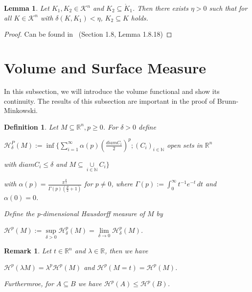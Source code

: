 \documentclass[a4paper]{book}
\newtheorem{lemma}[theorem]{Lemma}%
\newtheorem{remark}[theorem]{Remark}%
\newtheorem{definition}[theorem]{Definition}%
\numberwithin{theorem}{section}%
\begin{document}
\begin{lemma}
    Let $K_{1},K_{2}\in\mathscr{K}^{n}$ and $K_{2}\subseteq\mathring{K}_{1}$. Then there exists $\eta>0$ such that for all $K\in\mathscr{K}^{n}$ with $\delta(K,K_{1})<\eta$, $K_{2}\subseteq K$ holds.
\end{lemma}
\begin{proof}
    Can be found in~\citep{schneider2014convex} (Section 1.8, Lemma 1.8.18)
\end{proof}
    
\section{Volume and Surface Measure}
In this subsection, we will introduce the volume functional and show its continuity. The results of this subsection are important in the proof of Brunn-Minkowski.

\begin{definition}
	Let $M\subseteq\mathbb{R}^{n}, p\geq0$. For $\delta>0$ define
	\begin{center}
		$\displaystyle \mathscr{H}_{\delta}^{P}(M):=\inf\{\sum\limits_{i=1}^{\infty}\alpha(p)(\frac{diam C_{i}}{2})^{p};(C_{i})_{i\in\mathbb{N}}$ open sets in $\mathbb{R}^n$

		\hspace{1cm}with $diam C_{i}\leq\delta$ and $M\subseteq\underset{i\in\mathbb{N}}{\cup}{C_{i}}\}$
	\end{center}
	with $\alpha(p)=\frac{\pi^{\frac{p}{2}}}{\Gamma(p)(\frac{p}{2}+1)}$ for $p\neq0$, where $\Gamma(p):=\int_{0}^{\infty}t^{-1}e^{-t}\,dt$ and $\alpha(0)=0$.
	
	Define the p-dimensional Hausdorff measure of $M$ by
	\begin{center}
		$\mathscr{H}^{p}(M):=\underset{\delta>0}{\sup}\mathscr{H}_{\delta}^{p}(M)=\underset{\delta\to0}{\lim}\mathscr{H}_{\delta}^{p}(M)$.
	\end{center}
\end{definition}

\begin{remark}
	Let $t\in\mathbb{R}^{n}$ and $\lambda\in\mathbb{R}$, then we have
	\begin{center}
		$\mathscr{H}^{p}(\lambda M)=\lambda^{p}\mathscr{H}^{p}(M)$ and $\mathscr{H}^{p}(M=t)=\mathscr{H}^{p}(M)$.
	\end{center}
	Furthermroe, for $A\subseteq B$ we have $\mathscr{H}^{p}(A)\leq\mathscr{H}^{p}(B)$.
\end{remark}
\end{document}
